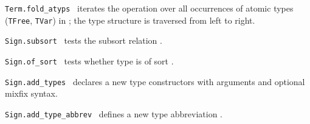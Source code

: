 \begin{isabellebody}
\begin{isamarkuptext}
\begin{description}
  \item \verb|Term.fold_atyps|~ iterates the operation
   over all occurrences of atomic types (\verb|TFree|, \verb|TVar|) in ; the type structure is traversed from left to
  right.

  \item \verb|Sign.subsort|~
  tests the subsort relation .

  \item \verb|Sign.of_sort|~ tests whether type
   is of sort .

  \item \verb|Sign.add_types|~ declares a
  new type constructors  with  arguments and
  optional mixfix syntax.

  \item \verb|Sign.add_type_abbrev|~
  defines a new type abbreviation .


\end{description}
\end{isamarkuptext}
\end{isabellebody}

